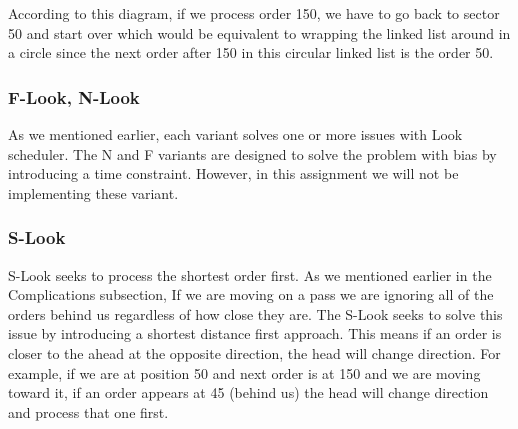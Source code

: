\documentclass[journal,10pt,onecolumn,compsoc,letterpaper,draftclsnofoot,table,xcdraw]{IEEEtran} \usepackage[margin=0.75in]{geometry}
\begin{document}
\noindent According to this diagram, if we process order 150, we have to go back to sector 50 and start over which would be equivalent to wrapping the linked list around in a circle since the next order after 150 in this circular linked list is the order 50.

\subsubsection{ F-Look, N-Look}
\noindent As we mentioned earlier, each variant solves one or more issues with Look scheduler. The N and F variants are designed to solve the problem with bias by introducing a time constraint. However, in this assignment we will not be implementing these variant.
\subsubsection{S-Look}
\noindent S-Look seeks to process the shortest order first. As we mentioned earlier in the Complications subsection, If we are moving on a pass we are ignoring all of the orders behind us regardless of how close they are. The S-Look seeks to solve this issue by introducing a shortest distance first approach. This means if an order is closer to the ahead at the opposite direction, the head will change direction. For example, if we are at position 50 and next order is at 150 and we are moving toward it, if an order appears at 45 (behind us) the head will change direction and process that one first.
\end{document}

